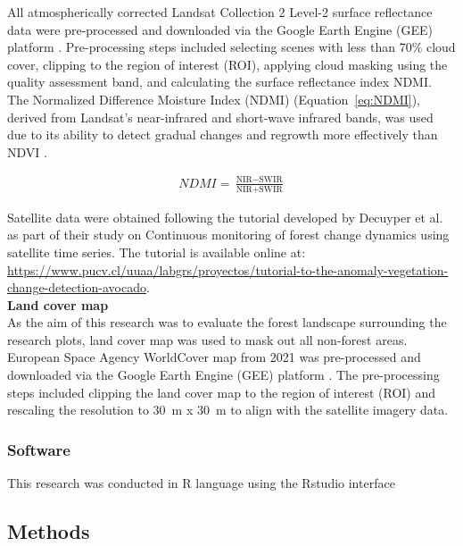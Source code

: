 All atmospherically corrected Landsat Collection 2 Level-2 surface reflectance data were pre-processed and downloaded via the Google Earth Engine (GEE) platform \citep{gorelickGoogleEarthEngine2017}. Pre-processing steps included selecting scenes with less than 70\% cloud cover, clipping to the region of interest (ROI), applying cloud masking using the quality assessment band, and calculating the surface reflectance index NDMI. The Normalized Difference Moisture Index (NDMI) (Equation~\ref{eq:NDMI}), derived from Landsat's near-infrared and short-wave infrared bands, was used due to its ability to detect gradual changes and regrowth more effectively than NDVI \citep{vermotePreliminaryAnalysisPerformance2016}.

\begin{align}
\label{eq:NDMI}
NDMI = \frac{\text{NIR} - \text{SWIR}}{\text{NIR} + \text{SWIR}}
\end{align}

Satellite data were obtained following the tutorial developed by Decuyper et al. as part of their study on Continuous monitoring of forest change dynamics using satellite time series. The tutorial is available online at: \hyperref[pucv.cl]{https://www.pucv.cl/uuaa/labgrs/proyectos/tutorial-to-the-anomaly-vegetation-change-detection-avocado}.\\

\textbf{Land cover map}\\

As the aim of this research was to evaluate the forest landscape surrounding the research plots, land cover map was used to mask out all non-forest areas. European Space Agency WorldCover map from 2021 was pre-processed and downloaded via the Google Earth Engine (GEE) platform \citep{gorelickGoogleEarthEngine2017, zanagaESAWorldCover102022}. The pre-processing steps included clipping the land cover map to the region of interest (ROI) and rescaling the resolution to 30~m x 30~m to align with the satellite imagery data. 

\subsubsection{Software}
This research was conducted in R language using the Rstudio interface \citep{}

\subsection{Methods}

